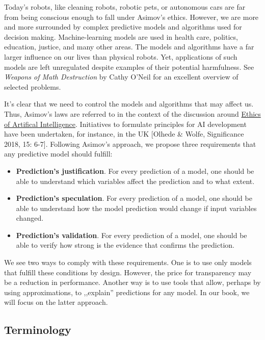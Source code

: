 \documentclass[12pt,]{krantz}
\providecommand{\tightlist}{%
  \setlength{\itemsep}{0pt}\setlength{\parskip}{0pt}}
\begin{document}
Today's robots, like cleaning robots, robotic pets, or autonomous cars are far from being conscious enough to fall under Asimov's ethics. However, we are more and more surrounded by complex predictive models and algorithms used for decision making. Machine-learning models are used in health care, politics, education, justice, and many other areas. The models and algorithms have a far larger influence on our lives than physical robots. Yet, applications of such models are left unregulated despite examples of their potential harmfulness. See \emph{Weapons of Math Destruction} by Cathy O'Neil \citep{ONeil} for an excellent overview of selected problems.

It's clear that we need to control the models and algorithms that may affect us. Thus, Asimov's laws are referred to in the context of the discussion around \href{https://en.wikipedia.org/wiki/Ethics_of_artificial_intelligence}{Ethics of Artifical Intelligence}. Initiatives to formulate principles for AI development have been undertaken, for instance, in the UK {[}Olhede \& Wolfe, Significance 2018, 15: 6-7{]}. Following Asimov's approach, we propose three requirements that any predictive model should fulfill:

\begin{itemize}
\tightlist
\item
  \textbf{Prediction's justification}. For every prediction of a model, one should be able to understand which variables affect the prediction and to what extent.
\item
  \textbf{Prediction's speculation}. For every prediction of a model, one should be able to understand how the model prediction would change if input variables changed.
\item
  \textbf{Prediction's validation}. For every prediction of a model, one should be able to verify how strong is the evidence that confirms the prediction.
\end{itemize}

We see two ways to comply with these requirements. One is to use only models that fulfill these conditions by design. However, the price for transparency may be a reduction in performance. Another way is to use tools that allow, perhaps by using approximations, to ,,explain'' predictions for any model. In our book, we will focus on the latter approach.

\hypertarget{terminology}{%
\subsection{Terminology}\label{terminology}}
\end{document}
